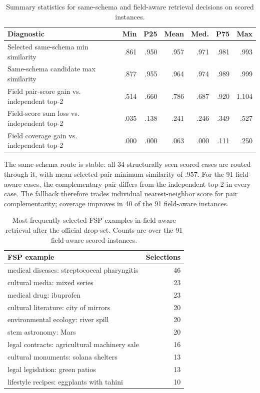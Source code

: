 \begin{table}[!htbp]
\centering
\caption{Summary statistics for same-schema and field-aware retrieval decisions on scored instances.}
\label{tab:retrieval-score-diagnostics}
\scriptsize
\begin{tabularx}{\linewidth}{@{}>{\raggedright\arraybackslash}Xrrrrrr@{}}
\toprule
Diagnostic & Min & P25 & Mean & Med. & P75 & Max \\
\midrule
Selected same-schema min similarity & .861 & .950 & .957 & .971 & .981 & .993 \\
Same-schema candidate max similarity & .877 & .955 & .964 & .974 & .989 & .999 \\
Field pair-score gain vs. independent top-2 & .514 & .660 & .786 & .687 & .920 & 1.104 \\
Field-score sum loss vs. independent top-2 & .035 & .138 & .241 & .246 & .349 & .527 \\
Field coverage gain vs. independent top-2 & .000 & .000 & .063 & .000 & .111 & .250 \\
\bottomrule
\end{tabularx}
\end{table}

The same-schema route is stable: all 34 structurally seen scored cases are routed through it, with mean selected-pair minimum similarity of .957. For the 91 field-aware cases, the complementary pair differs from the independent top-2 in every case. The fallback therefore trades individual nearest-neighbor score for pair complementarity; coverage improves in 40 of the 91 field-aware instances.

\begin{table}[!htbp]
\centering
\caption{Most frequently selected FSP examples in field-aware retrieval after the official drop-set. Counts are over the 91 field-aware scored instances.}
\label{tab:fsp-hubs}
\scriptsize
\begin{tabularx}{\linewidth}{@{}>{\raggedright\arraybackslash}Xr@{}}
\toprule
FSP example & Selections \\
\midrule
medical diseases: streptococcal pharyngitis & 46 \\
cultural media: mixed series & 23 \\
medical drug: ibuprofen & 23 \\
cultural literature: city of mirrors & 20 \\
environmental ecology: river spill & 20 \\
stem astronomy: Mars & 20 \\
legal contracts: agricultural machinery sale & 16 \\
cultural monuments: solana shelters & 13 \\
legal legislation: green patios & 13 \\
lifestyle recipes: eggplants with tahini & 10 \\
\bottomrule
\end{tabularx}
\end{table}

\FloatBarrier
\endgroup
